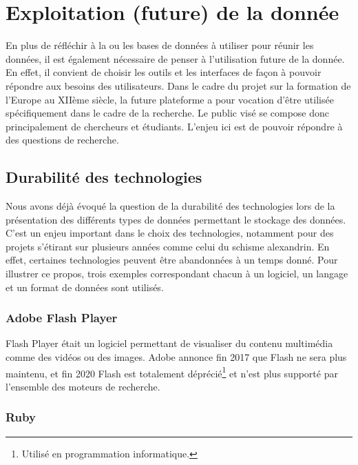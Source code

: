     \chapter{Exploitation (future) de la donnée}

En plus de réfléchir à la ou les bases de données à utiliser pour réunir les données, il est également nécessaire de penser à l’utilisation future de la donnée. En effet, il convient de choisir les outils et les interfaces de façon à pouvoir répondre aux besoins des utilisateurs. Dans le cadre du projet sur la formation de l’Europe au XIIème siècle, la future plateforme a pour vocation d’être utilisée spécifiquement dans le cadre de la recherche. Le public visé se compose donc principalement de chercheurs et étudiants. L’enjeu ici est de pouvoir répondre à des questions de recherche.



    \section{Durabilité des technologies}

Nous avons déjà évoqué la question de la durabilité des technologies lors de la présentation des différents types de données permettant le stockage des données. C’est un enjeu important dans le choix des technologies, notamment pour des projets s’étirant sur plusieurs années comme celui du schisme alexandrin.
En effet, certaines technologies peuvent être abandonnées à un temps donné. Pour illustrer ce propos, trois exemples correspondant chacun à un logiciel, un langage et un format de données sont utilisés.

    \subsection{Adobe Flash Player}
    
Flash Player était un logiciel permettant de visualiser du contenu multimédia comme des vidéos ou des images. Adobe annonce fin 2017 que Flash ne sera plus maintenu, et fin 2020 Flash est totalement déprécié\footnote{Utilisé en programmation informatique.} et n’est plus supporté par l’ensemble des moteurs de recherche.

    \subsection{Ruby}

